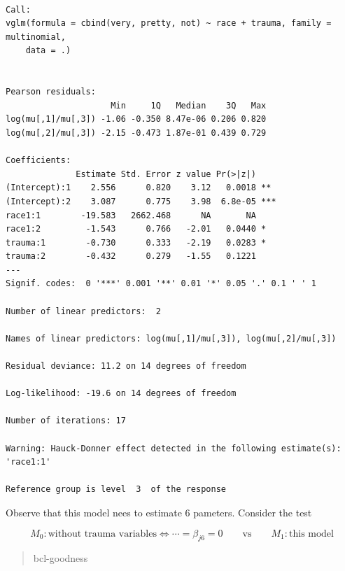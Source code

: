 \documentclass[]{book}
\newenvironment{Shaded}{\begin{snugshade}}{\end{snugshade}}
\newcommand{\CommentTok}[1]{\textcolor[rgb]{0.56,0.35,0.01}{\textit{#1}}}
\newcommand{\DataTypeTok}[1]{\textcolor[rgb]{0.13,0.29,0.53}{#1}}
\newcommand{\DecValTok}[1]{\textcolor[rgb]{0.00,0.00,0.81}{#1}}
\newcommand{\KeywordTok}[1]{\textcolor[rgb]{0.13,0.29,0.53}{\textbf{#1}}}
\newcommand{\NormalTok}[1]{#1}
\newcommand{\OperatorTok}[1]{\textcolor[rgb]{0.81,0.36,0.00}{\textbf{#1}}}
\newcommand{\StringTok}[1]{\textcolor[rgb]{0.31,0.60,0.02}{#1}}
\begin{document}
\begin{verbatim}

Call:
vglm(formula = cbind(very, pretty, not) ~ race + trauma, family = multinomial, 
    data = .)


Pearson residuals:
                     Min     1Q   Median    3Q   Max
log(mu[,1]/mu[,3]) -1.06 -0.350 8.47e-06 0.206 0.820
log(mu[,2]/mu[,3]) -2.15 -0.473 1.87e-01 0.439 0.729

Coefficients: 
              Estimate Std. Error z value Pr(>|z|)    
(Intercept):1    2.556      0.820    3.12   0.0018 ** 
(Intercept):2    3.087      0.775    3.98  6.8e-05 ***
race1:1        -19.583   2662.468      NA       NA    
race1:2         -1.543      0.766   -2.01   0.0440 *  
trauma:1        -0.730      0.333   -2.19   0.0283 *  
trauma:2        -0.432      0.279   -1.55   0.1221    
---
Signif. codes:  0 '***' 0.001 '**' 0.01 '*' 0.05 '.' 0.1 ' ' 1

Number of linear predictors:  2 

Names of linear predictors: log(mu[,1]/mu[,3]), log(mu[,2]/mu[,3])

Residual deviance: 11.2 on 14 degrees of freedom

Log-likelihood: -19.6 on 14 degrees of freedom

Number of iterations: 17 

Warning: Hauck-Donner effect detected in the following estimate(s):
'race1:1'

Reference group is level  3  of the response
\end{verbatim}

Observe that this model nees to estimate \(6\) pameters. Consider the test

\[M_0: \text{without trauma variables} \Leftrightarrow \cdots = \beta_{j6} = 0 \qquad\text{vs}\qquad M_1: \text{this model}\]

\begin{quote}
bcl-goodness
\end{quote}

\begin{Shaded}
\end{Shaded}
\end{document}
